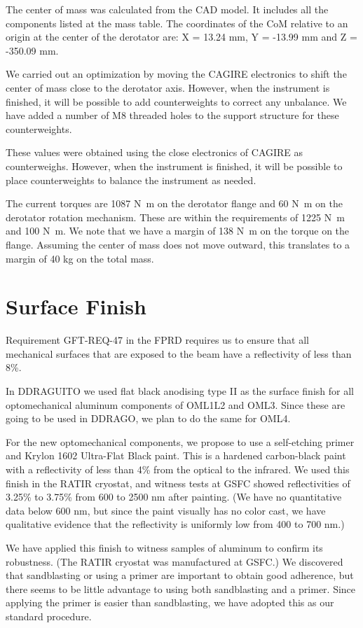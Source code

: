 \documentclass{report}
\begin{document}
The center of mass was calculated from the CAD model. It includes all the components listed at the mass table. The coordinates of the CoM relative to an origin at the center of the derotator are: X = 13.24 mm, Y = -13.99 mm and	Z = -350.09 mm. 

We carried out an optimization by moving the CAGIRE electronics to shift the center of mass close to the derotator axis. However, when the instrument is finished, it will be possible to add counterweights to correct any unbalance. We have added a number of M8 threaded holes to the support structure for these counterweights. 

These values were obtained using the close electronics of CAGIRE as counterweighs. However, when the instrument is finished, it will be possible to place counterweights to balance the instrument as needed.

The current torques are 1087 N~m on the derotator flange and 60 N~m on the derotator rotation mechanism. These are within the requirements of 1225 N~m and 100 N~m. We note that we have a margin of 138 N~m on the torque on the flange. Assuming the center of mass does not move outward, this translates to a margin of 40 kg on the total mass.

\chapter{Surface Finish}

Requirement GFT-REQ-47 in the FPRD requires us to ensure that all mechanical surfaces that are exposed to the beam have a reflectivity of less than 8\%.

In DDRAGUITO we used flat black anodising type II as the surface finish for all optomechanical aluminum components of OML1L2 and OML3. Since these are going to be used in DDRAGO, we plan to do the same for OML4. 

For the new optomechanical components, we propose to use a self-etching primer and Krylon 1602 Ultra-Flat Black paint. This is a hardened carbon-black paint with a reflectivity of less than 4\% from the optical to the infrared. We used this finish in the RATIR cryostat, and witness tests at GSFC showed reflectivities of 3.25\% to 3.75\% from 600 to 2500 nm after painting. (We have no quantitative data below 600 nm, but since the paint visually has no color cast, we have qualitative evidence that the reflectivity is uniformly low from 400 to 700 nm.)

We have applied this finish to witness samples of aluminum to confirm its robustness. (The RATIR cryostat was manufactured at GSFC.) We discovered that sandblasting or using a primer are important to obtain good adherence, but there seems to be little advantage to using both sandblasting and a primer. Since applying the primer is easier than sandblasting, we have adopted this as our standard procedure.
\end{document}
